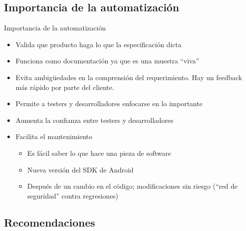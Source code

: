 \documentclass[pdf]
{beamer}
\begin{document}
        \subsection{Importancia de la automatizaci\'on}
        \begin{frame}{Importancia de la automatizaci\'on}
            \begin{itemize}
             \item<2-> Valida que producto haga lo que la especificaci\'on dicta
             \item<3-> Funciona como documentaci\'on ya que es una muestra ``viva''
             \item<4-> Evita ambig\"uedades en la comprensi\'on del requerimiento. Hay un feedback m\'as r\'apido por parte del cliente.
             \item<5-> Permite a testers y desarrolladores enfocarse en lo importante
             \item<6-> Aumenta la confianza entre testers y desarrolladores
             \item<7-> Facilita el mantenimiento
		\begin{itemize}
		  \item<8-> Es f\'acil saber lo que hace una pieza de software
		  \item<9-> Nueva versi\'on del SDK de Android
		  \item<10-> Despu\'es de un cambio en el c\'odigo; modificaciones sin riesgo (``red de seguridad'' contra regresiones)
		\end{itemize}

            \end{itemize}

        \end{frame}
	
	\subsection{Recomendaciones}   
\end{document}

